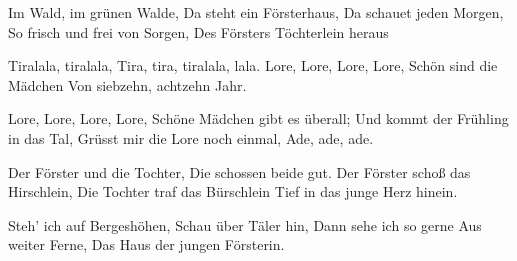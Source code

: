 
\beginverse
Im Wald, im gr\"unen Walde,
Da steht ein F\"orsterhaus,
Da schauet jeden Morgen,
So frisch und frei von Sorgen,
Des F\"orsters T\"ochterlein heraus
\endverse

\beginchorus
Tiralala, tiralala,
Tira, tira, tiralala, lala.
Lore, Lore, Lore, Lore,
Sch\"on sind die M\"adchen
Von siebzehn, achtzehn Jahr.


Lore, Lore, Lore, Lore,
Sch\"one M\"adchen gibt es \"uberall;
Und kommt der Fr\"uhling in das Tal,
Gr\"usst mir die Lore noch einmal,
Ade, ade, ade.
\endchorus

\beginverse
Der F\"orster und die Tochter,
Die schossen beide gut.
Der F\"orster scho\ss{} das Hirschlein,
Die Tochter traf das B\"urschlein
Tief in das junge Herz hinein.
\endverse

\beginverse
Steh' ich auf Bergesh\"ohen,
Schau \"uber T\"aler hin,
Dann sehe ich so gerne
Aus weiter Ferne,
Das Haus der jungen F\"orsterin.
\endverse

\endsong